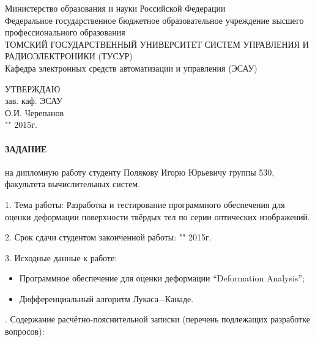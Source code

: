\newpage
{}

\begin{center}
 Министерство образования и науки Российской Федерации\\
 Федеральное государственное бюджетное образовательное учреждение высшего профессионального образования\\
 ТОМСКИЙ ГОСУДАРСТВЕННЫЙ УНИВЕРСИТЕТ СИСТЕМ УПРАВЛЕНИЯ И РАДИОЭЛЕКТРОНИКИ (ТУСУР)\\
 Кафедра электронных средств автоматизации и управления (ЭСАУ)\\
\end{center}

\begin{flushright}
 \begin{minipage}{0.4\textwidth}
  УТВЕРЖДАЮ \\
  зав. каф. ЭСАУ \\
  \underline{\hspace{2.5cm}}О.И. Черепанов \\
  "\underline{\hspace{1cm}}"\underline{\hspace{3cm}} 2015г.
 \end{minipage}
\end{flushright}

\vspace{1cm}

\paragraph*{\hfill ЗАДАНИЕ \hfill}

на дипломную работу студенту Полякову Игорю Юрьевичу группы 530, факультета вычислительных систем.

1. Тема работы: Разработка и тестирование программного обеспечения для оценки деформации поверхности твёрдых тел по серии оптических изображений.

2. Срок сдачи студентом законченной работы: "\underline{\hspace{1cm}}"\underline{\hspace{3cm}} 2015г.

3. Исходные данные к работе:

\begin{itemize}
 \item Программное обеспечение для оценки деформации ``Deformation Analysis'';
 \item Дифференциальный алгоритм Лукаса−Канаде.
\end{itemize}
. Содержание расчётно-пояснительной записки (перечень подлежащих разработке вопросов):

